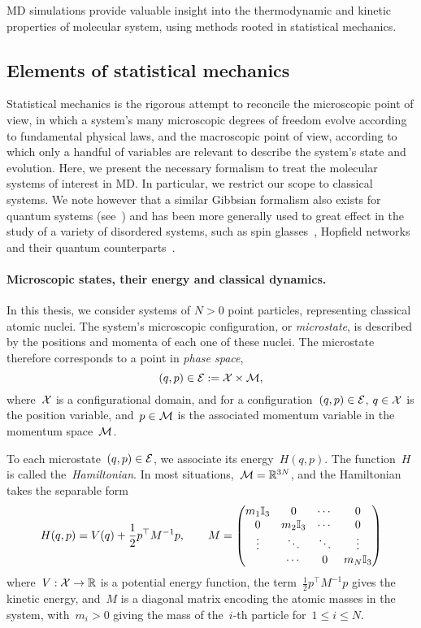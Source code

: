 MD simulations provide valuable insight into the thermodynamic and kinetic properties of molecular system, using methods rooted in statistical mechanics. 

\subsection{Elements of statistical mechanics}
Statistical mechanics is the rigorous attempt to reconcile the microscopic point of view, in which a system's many microscopic degrees of freedom evolve according to fundamental physical laws, and the macroscopic point of view, according to which only a handful of variables are relevant to describe the system's state and evolution.
Here, we present the necessary formalism to treat the molecular systems of interest in MD. In particular, we restrict our scope to classical systems.
We note however that a similar Gibbsian formalism also exists for quantum systems (see~\cite{F72}) and has been more generally used to great effect in the study of a variety of disordered systems, such as spin glasses~\cite{EA75}, Hopfield networks~\cite{P84} and their quantum counterparts~\cite{RY96,RMGLM18}.

\paragraph{Microscopic states, their energy and classical dynamics.}
In this thesis, we consider systems of $N>0$ point particles, representing classical atomic nuclei.
The system's microscopic configuration, or \textit{microstate}, is described by the positions and momenta of each one of these nuclei. The microstate therefore corresponds to a point in \textit{phase space}, 
\begin{equation}
    \label{eq:01:phase_space}
    (q,p)\in \mathcal{E} := \mathcal{X}\times \mathcal{M},
\end{equation}
where~$\mathcal{X}$ is a configurational domain, and for a configuration~$(q,p)\in\mathcal{E}$, $q\in\mathcal{X}$ is the position variable, and~$p\in \mathcal{M}$ is the associated momentum variable in the momentum space~$\mathcal{M}$.

To each microstate~$(q,p)\in\mathcal{E}$, we associate its energy~$H(q,p)$. The function~$H$ is called the~\textit{Hamiltonian}. In most situations,~$\mathcal{M}=\mathbb{R}^{3N}$, and the Hamiltonian takes the separable form
\begin{equation}
    \label{eq:01:hamiltonian}
    H(q,p) = V(q) + \frac12p^\top M^{-1}p,\qquad M = \begin{pmatrix}
    m_1 \mathbb{I}_3 & 0 & \dotsm & 0 \\
    0 & m_2 \mathbb{I}_3 & \dotsm & 0 \\
    \vdots & \ddots & \ddots & \vdots\\
    & \dotsm & 0 & m_N \mathbb{I}_3 
\end{pmatrix}
\end{equation}
where~$V:\mathcal{X}\to\mathbb{R}$ is a potential energy function, the term~$\frac12p^\top M^{-1}p$ gives the kinetic energy, and~$M$ is a diagonal matrix encoding the atomic masses in the system, with~$m_i>0$ giving the mass of the~$i$-th particle for~$1\leq i\leq N$.

